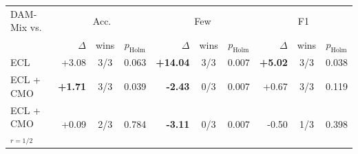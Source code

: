 \begin{tabular}{lrccrccrcc}
\toprule
DAM-Mix vs. & \multicolumn{3}{c}{Acc.} & \multicolumn{3}{c}{Few} & \multicolumn{3}{c}{F1} \\
 & $\Delta$ & wins & $p_{\mathrm{Holm}}$ & $\Delta$ & wins & $p_{\mathrm{Holm}}$ & $\Delta$ & wins & $p_{\mathrm{Holm}}$ \\
\midrule
ECL & +3.08 & 3/3 & 0.063 & \textbf{+14.04} & 3/3 & 0.007 & \textbf{+5.02} & 3/3 & 0.038 \\
ECL + CMO & \textbf{+1.71} & 3/3 & 0.039 & \textbf{-2.43} & 0/3 & 0.007 & +0.67 & 3/3 & 0.119 \\
ECL + CMO$_{r=1/2}$ & +0.09 & 2/3 & 0.784 & \textbf{-3.11} & 0/3 & 0.007 & -0.50 & 1/3 & 0.398 \\
\bottomrule
\end{tabular}
